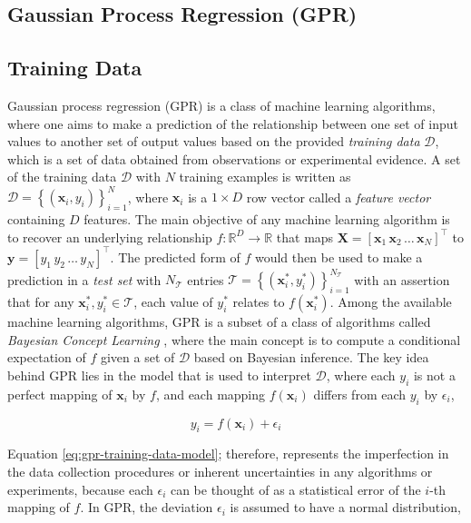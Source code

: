 \begin{spacing}{2.0}
    \section{Gaussian Process Regression (GPR)}

    \subsection{Training Data}

    Gaussian process regression (GPR) is a class of machine learning algorithms, where one aims to make a prediction of the relationship between 
    one set of input values to another set of output values based on the provided \textsl{training data} $\mathcal{D}$, which is a set of data 
    obtained from observations or experimental evidence. A set of the training data $\mathcal{D}$ with $N$ training examples is written as
    $\mathcal{D} = \left\{(\mathbf{x}_i,y_i)\right\}_{i=1}^N$, where $\mathbf{x}_i$ is a $1 \times D$ row vector called a \textsl{feature vector}
    containing $D$ features. The main objective of any machine learning algorithm is to recover an underlying relationship $f:\mathbb{R}^D\to\mathbb{R}$
    that maps $\mathbf{X} = \left[\mathbf{x}_1\,\mathbf{x}_2\,\ldots\,\mathbf{x}_N\right]^{\top}$ to $\mathbf{y} = \left[y_1\,y_2\,\ldots\,y_N\right]^{\top}$.
    The predicted form of $f$ would then be used to make a prediction in a \textsl{test set} with $N_{\mathcal{T}}$ entries
    $\mathcal{T} = \left\{(\mathbf{x}_i^*,y_i^*)\right\}_{i=1}^{N_{\mathcal{T}}}$ with an assertion that for any $\mathbf{x}_i^*,y_i^*\in\mathcal{T}$,
    each value of $y_i^*$ relates to $f(\mathbf{x}_i^*)$. Among the available machine learning algorithms, GPR is a subset of a class of algorithms
    called \textsl{Bayesian Concept Learning} \cite{B-MachineLearning-Murphy}, where the main concept is to compute a conditional expectation of $f$
    given a set of $\mathcal{D}$ based on Bayesian inference. The key idea behind GPR lies in the model that is used to interpret $\mathcal{D}$, 
    where each $y_i$ is not a perfect mapping of $\mathbf{x}_i$ by $f$, and each mapping $f(\mathbf{x}_i)$ differs from each $y_i$ by $\epsilon_i$,

    \begin{equation}
        y_i = f(\mathbf{x}_i) + \epsilon_i
        \label{eq:gpr-training-data-model}
    \end{equation}

    Equation \ref{eq:gpr-training-data-model}; therefore, represents the imperfection in the data collection procedures or inherent uncertainties
    in any algorithms or experiments, because each $\epsilon_i$ can be thought of as a statistical error of the $i$-th mapping of $f$. In GPR,
    the deviation $\epsilon_i$ is assumed to have a normal distribution,


\end{spacing}

